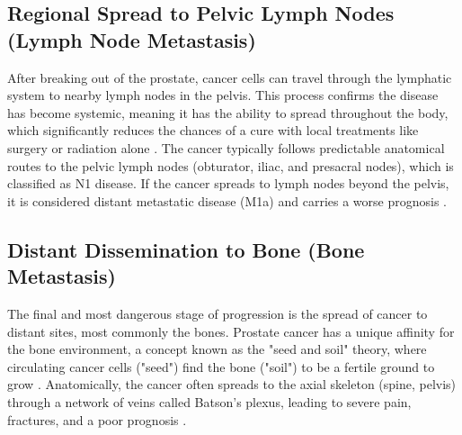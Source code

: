 \documentclass[11pt, a4paper]{article}
\begin{document}
\subsection{Regional Spread to Pelvic Lymph Nodes (Lymph Node Metastasis)}
After breaking out of the prostate, cancer cells can travel through the lymphatic system to nearby lymph nodes in the pelvis. This process confirms the disease has become systemic, meaning it has the ability to spread throughout the body, which significantly reduces the chances of a cure with local treatments like surgery or radiation alone \cite{CaglicBarrett2018, ZarzourGalgano2017}. The cancer typically follows predictable anatomical routes to the pelvic lymph nodes (obturator, iliac, and presacral nodes), which is classified as N1 disease. If the cancer spreads to lymph nodes beyond the pelvis, it is considered distant metastatic disease (M1a) and carries a worse prognosis \cite{CaglicBarrett2018, OliveiraFerreira2023}.

\subsection{Distant Dissemination to Bone (Bone Metastasis)}
The final and most dangerous stage of progression is the spread of cancer to distant sites, most commonly the bones. Prostate cancer has a unique affinity for the bone environment, a concept known as the "seed and soil" theory, where circulating cancer cells ("seed") find the bone ("soil") to be a fertile ground to grow \cite{RucciAngelucci2014, PawanRich2024}. Anatomically, the cancer often spreads to the axial skeleton (spine, pelvis) through a network of veins called Batson's plexus, leading to severe pain, fractures, and a poor prognosis \cite{UnknownAuthor2012, RucciAngelucci2014, MohseniniaZamaniSiahkali2024}.
\end{document}
